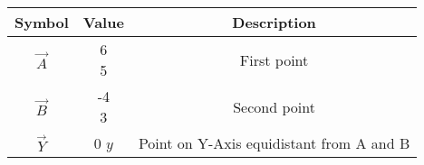 \begin{tabular}[12pt]{ |c|c|c|}
    \hline
    \textbf{Symbol} & \textbf{Value} & \textbf{Description} \\
    \hline
    $\vec{A}$ & \myvec{6\\5} & First point\\
    \hline 
    $\vec{B}$ & \myvec{-4\\3} & Second point\\
    \hline
    $\vec{Y}$ & \myvec{0\\$y$} & Point on Y-Axis equidistant from A and B\\
    \hline
    \end{tabular}
